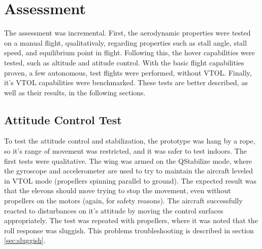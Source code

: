 \chapter{Assessment} \label{chap:assessment}

The assessment was incremental. First, the aerodynamic properties were tested on a manual flight, qualitativaly, regarding properties such as stall angle, stall speed, and equilibrium point in flight. Following this, the hover capabilities were tested, such as altitude and atitude control. With the basic flight capabilities proven, a few autonomous, test flights were performed, without VTOL. Finally, it's VTOL capabilities were benchmarked. These tests are better described, as well as their results, in the following sections.


\section{Attitude Control Test}

To test the attitude control and stabilization, the prototype was hang by a rope, so it's range of movement was restricted, and it was safer to test indoors.
%
The first tests were qualitative. The wing was armed on the QStabilize mode, where the gyroscope and accelerometer are used to try to maintain the aircraft leveled in VTOL mode (propellers spinning parallel to ground).
%
The expected result was that the elevons should move trying to stop the movement, even without propellers on the motors (again, for safety reasons).
%
The aircraft successfully reacted to disturbances on it's attitude by moving the control surfaces appropriately.
%
The test was repeated with propellers, where it was noted that the roll response was sluggish. This problems troubleshooting is described in section \ref{sec:sluggish}.
